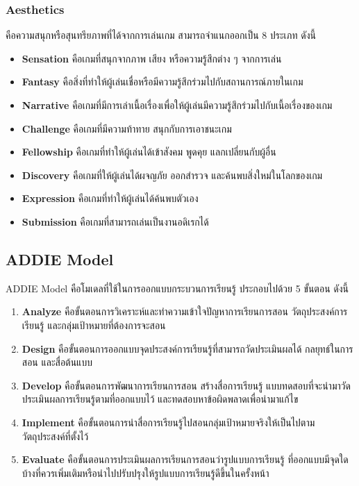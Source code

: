 \documentclass[12pt,oneside,openright,a4paper]{cpe-thai-project}
\begin{document}
\subsubsection{Aesthetics}
	คือความสนุกหรือสุนทรียภาพที่ได้จากการเล่นเกม สามารถจำแนกออกเป็น 8 ประเภท ดังนี้
\begin{itemize}
  \item \textbf{Sensation} คือเกมที่สนุกจากภาพ เสียง หรือความรู้สึกต่าง ๆ จากการเล่น
  \item \textbf{Fantasy} คือสิ่งที่ทำให้ผู้เล่นเชื่อหรือมีความรู้สึกร่วมไปกับสถานการณ์ภายในเกม
  \item \textbf{Narrative} คือเกมที่มีการเล่าเนื้อเรื่องเพื่อให้ผู้เล่นมีความรู้สึกร่วมไปกับเนื้อเรื่องของเกม
  \item \textbf{Challenge} คือเกมที่มีความท้าทาย สนุกกับการเอาชนะเกม
  \item \textbf{Fellowship} คือเกมที่ทำให้ผู้เล่นได้เข้าสังคม พูดคุย แลกเปลี่ยนกับผู้อื่น
  \item \textbf{Discovery} คือเกมที่ให้ผู้เล่นได้ผจญภัย ออกสำรวจ และค้นพบสิ่งใหม่ในโลกของเกม
  \item \textbf{Expression} คือเกมที่ทำให้ผู้เล่นได้ค้นพบตัวเอง
  \item \textbf{Submission} คือเกมที่สามารถเล่นเป็นงานอดิเรกได้
\end{itemize}

\subsection{ADDIE Model}
ADDIE Model คือโมเดลที่ใช้ในการออกแบบกระบวนการเรียนรู้ ประกอบไปด้วย 5 ขั้นตอน ดังนี้
\begin{enumerate}
  \item \textbf{Analyze} คือขั้นตอนการวิเคราะห์และทำความเข้าใจปัญหาการเรียนการสอน 
  วัตถุประสงค์การเรียนรู้ และกลุ่มเป้าหมายที่ต้องการจะสอน
  \item \textbf{Design} คือขั้นตอนการออกแบบจุดประสงค์การเรียนรู้ที่สามารถวัดประเมินผลได้ 
  กลยุทธ์ในการสอน และสื่อต้นแบบ
  \item \textbf{Develop} คือขั้นตอนการพัฒนาการเรียนการสอน สร้างสื่อการเรียนรู้ 
  แบบทดสอบที่จะนำมาวัดประเมินผลการเรียนรู้ตามที่ออกแบบไว้ และทดสอบหาข้อผิดพลาดเพื่อนำมาแก้ไข
  \item \textbf{Implement} คือขั้นตอนการนำสื่อการเรียนรู้ไปสอนกลุ่มเป้าหมายจริงให้เป็นไปตามวัตถุประสงค์ที่ตั้งไว้
  \item \textbf{Evaluate} คือขั้นตอนการประเมินผลการเรียนการสอนว่ารูปแบบการเรียนรู้
  ที่ออกแบบมีจุดใดบ้างที่ควรเพิ่มเติมหรือนำไปปรับปรุงให้รูปแบบการเรียนรู้ดีขึ้นในครั้งหน้า
\end{enumerate}
\end{document}
